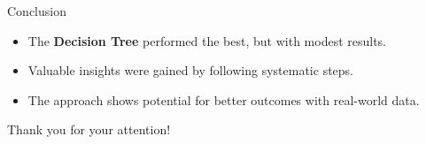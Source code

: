 \documentclass{beamer}
\begin{document}
\begin{frame}{Conclusion}
    \begin{itemize}
        \item The \textbf{Decision Tree} performed the best, but with modest results.
        \item Valuable insights were gained by following systematic steps.
        \item The approach shows potential for better outcomes with real-world data.
    \end{itemize}
\end{frame}


\begin{frame}{}
    \centering
    Thank you for your attention! \\
\end{frame}
\end{document}
